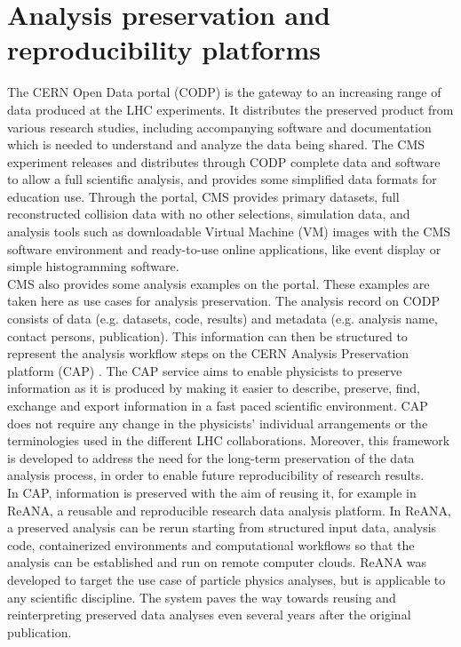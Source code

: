 \documentclass[letter]{article}
\newcommand\tab[1][1cm]{\hspace*{#1}}
\begin{document}
\section{Analysis preservation and reproducibility platforms}
\tab The CERN Open Data portal (CODP) \cite{codp} is the gateway to an increasing range of data produced at the LHC experiments.
It distributes the preserved product from various research studies, including accompanying software and documentation which is needed to understand and analyze the data being shared.
The CMS experiment releases and distributes through CODP complete data and software to allow a full scientific
analysis, and provides some simplified data formats for education use. Through the portal, CMS provides primary datasets, full reconstructed collision data with no other selections, simulation data, and analysis tools such as downloadable Virtual Machine (VM) images with the CMS software environment and ready-to-use online applications, like event display or simple histogramming software.
\vspace{3pt} \\ \tab CMS also provides some analysis examples on the portal. These examples are taken here as use cases for analysis preservation. The analysis record on CODP consists of data (e.g. datasets, code, results) and metadata (e.g. analysis name, contact persons,
publication). This information can then be structured to represent the analysis workflow steps on the CERN Analysis Preservation platform (CAP) \cite{cap}. The CAP service aims to enable physicists to preserve information as it is produced by making it easier to describe, preserve, find, exchange and export information in a fast paced scientific environment. CAP does not require any change in the physicists’ individual arrangements or the terminologies used in the different LHC collaborations. Moreover, this framework is developed to address the need for the long-term preservation of the data analysis process, in order to enable future reproducibility of research
results.
\vspace{3pt} \\ \tab In CAP, information is preserved with the aim of reusing it, for example in ReANA\cite{reana}, a reusable and reproducible research data analysis platform. In ReANA, a preserved analysis can be rerun starting from structured input data, analysis code, containerized environments and computational workflows so that the analysis can be established and run on remote computer clouds. ReANA was developed to target the use case of particle physics analyses, but is applicable to any scientific discipline. The system paves the way towards reusing and reinterpreting preserved data analyses even several years after the original publication.
\end{document}
